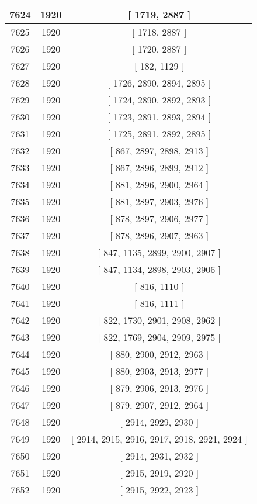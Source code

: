 \begin{center}
\begin{longtable}[H]{|| c c c ||}
\hline
7624 & 1920 & [ 1719, 2887 ] \\ 
\hline
7625 & 1920 & [ 1718, 2887 ] \\ 
\hline
7626 & 1920 & [ 1720, 2887 ] \\ 
\hline
7627 & 1920 & [ 182, 1129 ] \\ 
\hline
7628 & 1920 & [ 1726, 2890, 2894, 2895 ] \\ 
\hline
7629 & 1920 & [ 1724, 2890, 2892, 2893 ] \\ 
\hline
7630 & 1920 & [ 1723, 2891, 2893, 2894 ] \\ 
\hline
7631 & 1920 & [ 1725, 2891, 2892, 2895 ] \\ 
\hline
7632 & 1920 & [ 867, 2897, 2898, 2913 ] \\ 
\hline
7633 & 1920 & [ 867, 2896, 2899, 2912 ] \\ 
\hline
7634 & 1920 & [ 881, 2896, 2900, 2964 ] \\ 
\hline
7635 & 1920 & [ 881, 2897, 2903, 2976 ] \\ 
\hline
7636 & 1920 & [ 878, 2897, 2906, 2977 ] \\ 
\hline
7637 & 1920 & [ 878, 2896, 2907, 2963 ] \\ 
\hline
7638 & 1920 & [ 847, 1135, 2899, 2900, 2907 ] \\ 
\hline
7639 & 1920 & [ 847, 1134, 2898, 2903, 2906 ] \\ 
\hline
7640 & 1920 & [ 816, 1110 ] \\ 
\hline
7641 & 1920 & [ 816, 1111 ] \\ 
\hline
7642 & 1920 & [ 822, 1730, 2901, 2908, 2962 ] \\ 
\hline
7643 & 1920 & [ 822, 1769, 2904, 2909, 2975 ] \\ 
\hline
7644 & 1920 & [ 880, 2900, 2912, 2963 ] \\ 
\hline
7645 & 1920 & [ 880, 2903, 2913, 2977 ] \\ 
\hline
7646 & 1920 & [ 879, 2906, 2913, 2976 ] \\ 
\hline
7647 & 1920 & [ 879, 2907, 2912, 2964 ] \\ 
\hline
7648 & 1920 & [ 2914, 2929, 2930 ] \\ 
\hline
7649 & 1920 & [ 2914, 2915, 2916, 2917, 2918, 2921, 2924 ] \\ 
\hline
7650 & 1920 & [ 2914, 2931, 2932 ] \\ 
\hline
7651 & 1920 & [ 2915, 2919, 2920 ] \\ 
\hline
7652 & 1920 & [ 2915, 2922, 2923 ] \\ 
\hline

\end{longtable}
\end{center}
